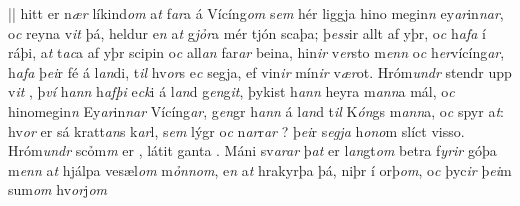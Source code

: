 ||
  hitt er   n\textit{ær} líkind\textit{om} a\textit{t} f\textit{ar}a á   Vícíng\textit{om} s\textit{em} hér liggja hino megin\textit{n}
ey\textit{ar}in\textit{n}\textit{ar}, o\textit{c} reyna v\textit{it} þá,
heldur e\textit{n} a\textit{t} g\textit{jỏr}a mér   tjón     scaþa; þ\textit{ess}ir   allt af yþr,  o\textit{c} h\textit{afa} í ráþi, a\textit{t}
t\textit{ac}a af yþr scipin o\textit{c} all\textit{an} far\textit{ar} beina,   hin\textit{ir} v\textit{er}sto m\textit{enn} o\textit{c}
h\textit{er}vícíng\textit{ar},   
h\textit{afa} þ\textit{ei}r   fé á  l\textit{an}di, 
t\textit{il} hv\textit{or}s e\textit{c}  segja, ef vin\textit{ir} mín\textit{ir} v\textit{ær}ot. Hróm\textit{undr} stendr   upp v\textit{it} , þ\textit{ví} h\textit{ann} h\textit{afþi} e\textit{ck}i á l\textit{an}d
g\textit{en}g\textit{it}, þykist  h\textit{ann} heyra
m\textit{ann}a mál, o\textit{c} hinomegin\textit{n}
Ey\textit{ar}in\textit{n}\textit{ar}  Vícíng\textit{ar}, g\textit{en}gr h\textit{ann} á
l\textit{an}d t\textit{il} K\textit{ón}gs m\textit{ann}a, o\textit{c} spyr
a\textit{t}: hv\textit{or} er sá   kratt\textit{an}s   k\textit{ar}l,
s\textit{em}  lýgr o\textit{c}  n\textit{ar}r\textit{ar}  ? þ\textit{ei}r s\textit{egja} h\textit{ono}m slíct   visso. 
Hróm\textit{undr}   scỏm\textit{m}  er  ,  
 látit    ganta   . Máni sv\textit{arar} þ\textit{at} er l\textit{an}gt\textit{om} betra
f\textit{yrir} góþa m\textit{enn} a\textit{t} hjálpa vesæl\textit{om} m\textit{ỏnnom}, e\textit{n}
a\textit{t}  hrakyrþa   þá,   niþr í  orþ\textit{om}, o\textit{c}  þyc\textit{ir} þ\textit{ei}m sum\textit{om} hv\textit{or}j\textit{om}
